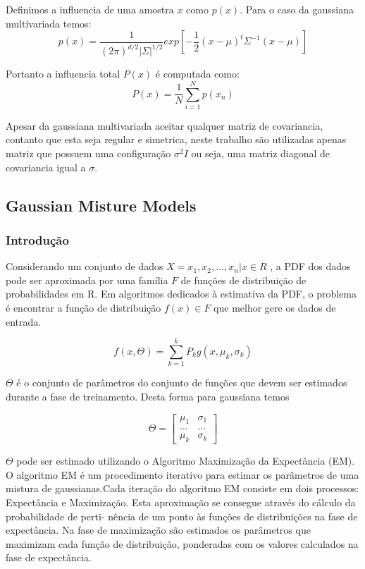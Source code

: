 \documentclass[ 
	article,			%
	11pt,				%
	oneside,			%
	a4paper,			%
	english,			%
	brazil,				%
	]{abntex2}
\begin{document}
Definimos a influencia de uma amostra $x$ como $p(x)$. Para o caso da gaussiana
multivariada temos:
\begin{equation}
p(x)=\frac{1}{ (2 \pi)^{d/2}  |\Sigma|^{1/2}}  
exp[-\frac{1}{2}(x-\mu)^t\Sigma^{-1}(x-\mu)]
\end{equation}


Portanto a influencia total $P(x)$ é computada como:
\begin{equation}
P(x)=\frac{1}{N} \sum_{i=1}^{N}p(x_n) 
\end{equation}

Apesar da gaussiana multivariada aceitar qualquer matriz de covariancia,
contanto que esta seja regular e simetrica, neste trabalho são utilizadas
apenas matriz que possuem uma configuração $\sigma^2 I$ ou seja, uma matriz
diagonal de covariancia igual a $\sigma$.


\subsection{Gaussian Misture Models}

\subsubsection{Introdução}
Considerando um conjunto de dados $X={x_1,x_2,\ldots,x_n}| x \in R$ , a PDF dos
dados pode ser aproximada por uma família $F$ de funções de distribuição de
probabilidades em R. Em algoritmos dedicados à estimativa da PDF, o problema é
encontrar a função de distribuição $f(x) \in F$ que melhor gere os dados de
entrada.

\begin{equation}
f(x,\Theta)=\sum^{k}_{k=1}P_kg(x,\mu_k,\sigma_k)
\end{equation}

$\Theta$ é o conjunto de parâmetros do conjunto de funções que devem ser
estimados durante a fase de treinamento. Desta forma para gaussiana temos

\begin{equation}
	\Theta=
	\begin{bmatrix}
		\mu_1 & \sigma_1 \\
		\ldots & \ldots \\
		\mu_k & \sigma_k 
	\end{bmatrix}
\end{equation}

$\Theta$ pode ser estimado utilizando o Algoritmo Maximização da Expectância
(EM). O algoritmo EM é um procedimento iterativo para estimar
os parâmetros de uma mistura de gaussianas.Cada iteração do algoritmo EM
consiste em dois processos: Expectância e Maximização.
Esta aproximação se consegue através do cálculo da probabilidade de perti-
nência de um ponto às funções de distribuições na fase de expectância. Na fase
de maximização são estimados os parâmetros que maximizam cada função de
distribuição, ponderadas com os valores calculados na fase de expectância.
\end{document}
